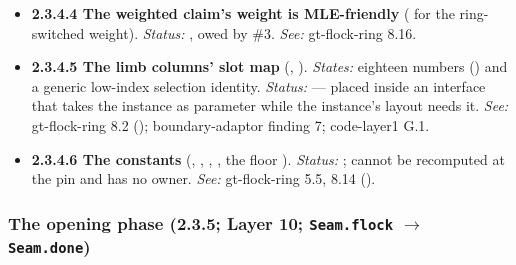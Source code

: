 \begin{itemize}[label={}, leftmargin=1.3em, itemindent=-1.3em, labelwidth=0pt, labelsep=0pt, itemsep=4pt, topsep=3pt]
\begin{itemize}[label={}, leftmargin=1.3em, itemindent=-1.3em, labelwidth=0pt, labelsep=0pt, itemsep=4pt, topsep=3pt]
\end{itemize}
\item {}\label{obl:node-2.3.4.4}\textbf{2.3.4.4 The weighted claim's weight is MLE-friendly} ( for the ring-switched weight). \emph{Status:} , owed by \#3. \emph{See:} gt-flock-ring 8.16.
\item {}\label{obl:node-2.3.4.5}\oblflag\textbf{2.3.4.5 The limb columns' slot map} (, ). \emph{States:} eighteen numbers () and a generic low-index selection identity. \emph{Status:}   — placed inside an interface that takes the instance as parameter while the instance's layout needs it. \emph{See:} gt-flock-ring 8.2 (); boundary-adaptor finding 7; code-layer1 G.1.
\item {}\label{obl:node-2.3.4.6}\textbf{2.3.4.6 The constants} (, , , , the floor ). \emph{Status:} ;  cannot be recomputed at the pin and has no owner. \emph{See:} gt-flock-ring 5.5, 8.14 ().
\end{itemize}

\subsubsection{The opening phase (2.3.5; Layer 10; \texttt{Seam.flock} \texorpdfstring{$\to$}{to} \texttt{Seam.done})}\label{sec:obl-phase-opening}

